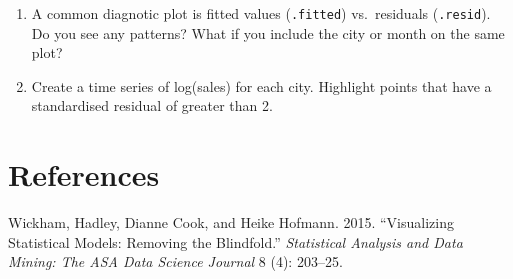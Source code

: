 \begin{enumerate}
\def\labelenumi{\arabic{enumi}.}
\item
  A common diagnotic plot is fitted values (\texttt{.fitted})
  vs.~residuals (\texttt{.resid}). Do you see any patterns? What if you
  include the city or month on the same plot?
\item
  Create a time series of log(sales) for each city. Highlight points
  that have a standardised residual of greater than 2.
\end{enumerate}

\section*{References}\label{references}

\hypertarget{refs}{}
\hypertarget{ref-model-vis-paper}{}
Wickham, Hadley, Dianne Cook, and Heike Hofmann. 2015. ``Visualizing
Statistical Models: Removing the Blindfold.'' \emph{Statistical Analysis
and Data Mining: The ASA Data Science Journal} 8 (4): 203--25.
